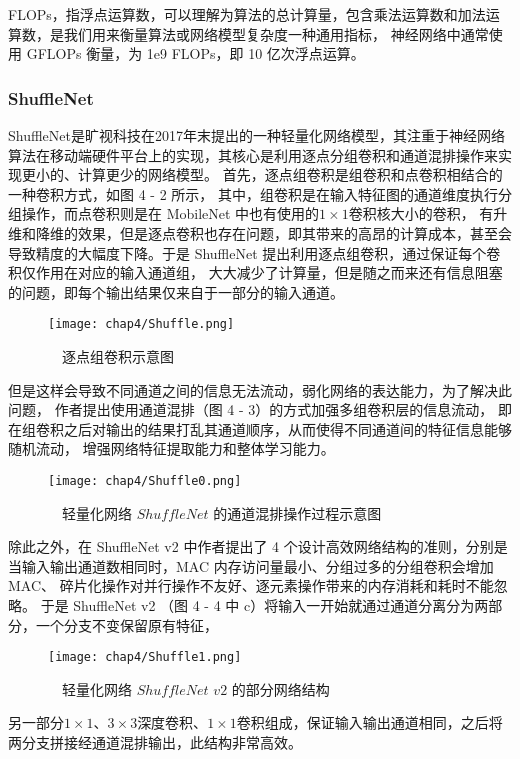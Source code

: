 FLOPs，指浮点运算数，可以理解为算法的总计算量，包含乘法运算数和加法运算数，是我们用来衡量算法或网络模型复杂度一种通用指标，
神经网络中通常使用 GFLOPs 衡量，为 1e9 FLOPs，即 10 亿次浮点运算。

\subsubsection{ShuffleNet}
ShuffleNet是旷视科技在2017年末提出的一种轻量化网络模型，其注重于神经网络算法在移动端硬件平台上的实现，其核心是利用逐点分组卷积和通道混排操作来实现更小的、计算更少的网络模型。
首先，逐点组卷积是组卷积和点卷积相结合的一种卷积方式，如图 4 - 2 所示，
其中，组卷积是在输入特征图的通道维度执行分组操作，而点卷积则是在 MobileNet 中也有使用的$1\times 1$卷积核大小的卷积，
有升维和降维的效果，但是逐点卷积也存在问题，即其带来的高昂的计算成本，甚至会导致精度的大幅度下降。于是 ShuffleNet 提出利用逐点组卷积，通过保证每个卷积仅作用在对应的输入通道组，
大大减少了计算量，但是随之而来还有信息阻塞的问题，即每个输出结果仅来自于一部分的输入通道。
\vspace{6mm}
\begin{figure}[h]
	\centering
	\texttt{[image: chap4/Shuffle.png]}
	\caption{\ \ 逐点组卷积示意图}
	\label{fig4-2}
\end{figure}
\vspace{3mm}

但是这样会导致不同通道之间的信息无法流动，弱化网络的表达能力，为了解决此问题，
作者提出使用通道混排（图 4 - 3）的方式加强多组卷积层的信息流动，
即在组卷积之后对输出的结果打乱其通道顺序，从而使得不同通道间的特征信息能够随机流动，
增强网络特征提取能力和整体学习能力。
\vspace{3mm}
\begin{figure}[h]
	\centering
	\texttt{[image: chap4/Shuffle0.png]}
	\caption{\ \ 轻量化网络 $ShuffleNet$ 的通道混排操作过程示意图}
	\label{fig4-3}
\end{figure}
\vspace{3mm}

除此之外，在 ShuffleNet v2 中作者提出了 4 个设计高效网络结构的准则，分别是当输入输出通道数相同时，MAC 内存访问量最小、分组过多的分组卷积会增加 MAC、
碎片化操作对并行操作不友好、逐元素操作带来的内存消耗和耗时不能忽略。
于是 ShuffleNet v2 （图 4 - 4 中 c）将输入一开始就通过通道分离分为两部分，一个分支不变保留原有特征，
\vspace{3mm}
\begin{figure}[h]
	\centering
	\texttt{[image: chap4/Shuffle1.png]}
	\caption{\ \ 轻量化网络 $ShuffleNet$ $v2$ 的部分网络结构}
	\label{fig4-4}
\end{figure}
\vspace{3mm}
另一部分$1\times 1$、$3\times 3$深度卷积、$1\times 1$卷积组成，保证输入输出通道相同，之后将两分支拼接经通道混排输出，此结构非常高效。


